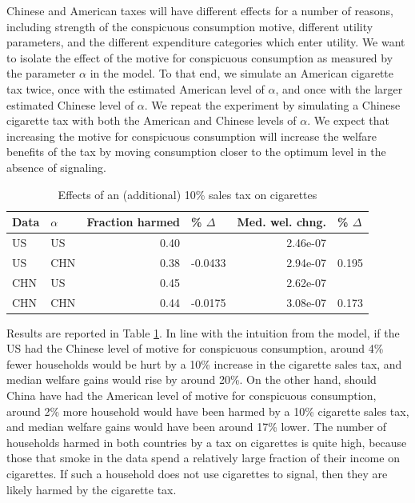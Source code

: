 \documentclass[11pt]{article}
\begin{document}
\begin{CJK}{UTF8}{gbsn}
Chinese and American taxes will have different effects for a number of reasons, including strength of the conspicuous consumption motive, different utility parameters, and the different expenditure categories which enter utility.  We want to isolate the effect of the motive for conspicuous consumption as measured by the parameter $\alpha$ in the model.  To that end, we simulate an American cigarette tax twice, once with the estimated American level of $\alpha$, and once with the larger estimated Chinese level of $\alpha$.  We repeat the experiment by simulating a Chinese cigarette tax with both the American and Chinese levels of $\alpha$.  We expect that increasing the motive for conspicuous consumption will increase the welfare benefits of the tax by moving consumption closer to the optimum level in the absence of signaling.


\begin{table}[ht]
    \centering
    \begin{tabular}{l l rlrl}
\toprule
Data     & $\alpha$ & Fraction harmed & \% $\Delta$ & Med. wel. chng. & \% $\Delta$ \\
\midrule
US       & US    & 0.40            &          & 2.46e-07        & \\
US       & CHN   & 0.38            & -0.0433  & 2.94e-07        & 0.195 \\
CHN      & US    & 0.45            &          & 2.62e-07        & \\
CHN      & CHN   & 0.44            & -0.0175  & 3.08e-07        & 0.173 \\
\bottomrule
\end{tabular}
\caption{Effects of an (additional) 10\% sales tax on cigarettes} 
\label{tab:cig_tax}
\end{table}

Results are reported in Table \ref{tab:cig_tax}.  In line with the intuition from the model, if the US had the Chinese level of motive for conspicuous consumption, around 4\% fewer households would be hurt by a 10\% increase in the cigarette sales tax, and median welfare gains would rise by around 20\%.  On the other hand, should China have had the American level of motive for conspicuous consumption, around 2\% more household would have been harmed by a 10\% cigarette sales tax, and median welfare gains would have been around 17\% lower.  The number of households harmed in both countries by a tax on cigarettes is quite high, because those that smoke in the data spend a relatively large fraction of their income on cigarettes.  If such a household does not use cigarettes to signal, then they are likely harmed by the cigarette tax.


\end{CJK}
\end{document}
